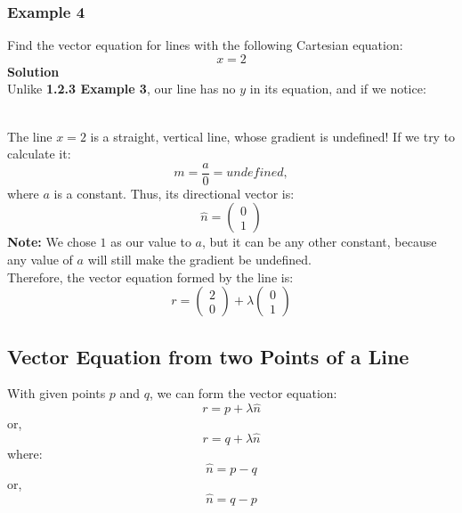 \documentclass[hidelinks, a4paper, 12pt]{article}
\newcommand{\bd}{\textbf}
\newcommand{\nhat}{\hat{n}}
\newcommand{\n}{\\[\baselineskip]}
\begin{document}
            \subsubsection{Example 4}
                Find the vector equation for lines with the following Cartesian equation:
                \[x = 2\]
                \bd{Solution}\\
                Unlike \bd{1.2.3 Example 3}, our line has no $y$ in its equation, and if we notice:
                \begin{figure}[!ht]
                    \centering
                \end{figure}\n
                The line $x = 2$ is a straight, vertical line, whose gradient is undefined! If we try to calculate it:
                \[m = \frac{a}{0} = undefined,\]
                where $a$ is a constant. Thus, its directional vector is:
                \[\nhat = \begin{pmatrix} 0 \\ 1 \end{pmatrix}\]
                \bd{Note: }We chose $1$ as our value to $a$, but it can be any other constant, because any value of $a$
                will still make the gradient be undefined.\n
                Therefore, the vector equation formed by the line is:
                \[r = \begin{pmatrix} 2 \\ 0 \end{pmatrix} + \lambda \begin{pmatrix} 0 \\ 1 \end{pmatrix}\]
        \subsection{Vector Equation from two Points of a Line}
            With given points $p$ and $q$, we can form the vector equation:
            \[r = p + \lambda\nhat\]
            or,
            \[r = q + \lambda\nhat\]
            where:
            \[\nhat = p - q\]
            or,
            \[\nhat = q - p\]
\end{document}
